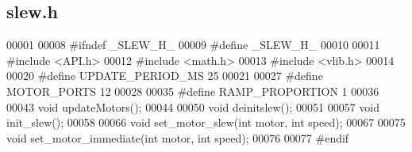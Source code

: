 \subsection{slew.\+h}
\label{slew_8h_source}

\begin{DoxyCode}
00001 
00008 \textcolor{preprocessor}{#ifndef \_SLEW\_H\_}
00009 \textcolor{preprocessor}{#define \_SLEW\_H\_}
00010 
00011 \textcolor{preprocessor}{#include <API.h>}
00012 \textcolor{preprocessor}{#include <math.h>}
00013 \textcolor{preprocessor}{#include <vlib.h>}
00014 
00020 \textcolor{preprocessor}{#define UPDATE\_PERIOD\_MS 25}
00021 
00027 \textcolor{preprocessor}{#define MOTOR\_PORTS 12}
00028 
00035 \textcolor{preprocessor}{#define RAMP\_PROPORTION 1}
00036 
00043 \textcolor{keywordtype}{void} updateMotors();
00044 
00050 \textcolor{keywordtype}{void} deinitslew();
00051 
00057 \textcolor{keywordtype}{void} init_slew();
00058 
00066 \textcolor{keywordtype}{void} set_motor_slew(\textcolor{keywordtype}{int} motor, \textcolor{keywordtype}{int} speed);
00067 
00075 \textcolor{keywordtype}{void} set_motor_immediate(\textcolor{keywordtype}{int} motor, \textcolor{keywordtype}{int} speed);
00076 
00077 \textcolor{preprocessor}{#endif}
\end{DoxyCode}
